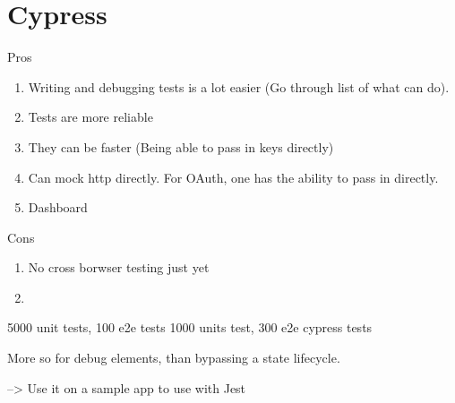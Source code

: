 \maketitle{}
\section{ Cypress }

Pros
\begin{enumerate}
  \item Writing and debugging tests is a lot easier (Go through list of what
  can do).
  \item Tests are more reliable
  \item They can be faster (Being able to pass in keys directly)
  \item Can mock http directly. For OAuth, one has the ability to pass in
  directly.
  \item Dashboard
\end{enumerate}

Cons
  \begin{enumerate}
    \item No cross borwser testing just yet
    \item
  \end{enumerate}

  5000 unit tests, 100 e2e tests
  1000 units test, 300 e2e cypress tests

  More so for debug elements, than bypassing a state lifecycle.

  --> Use it on a sample app to use with Jest
